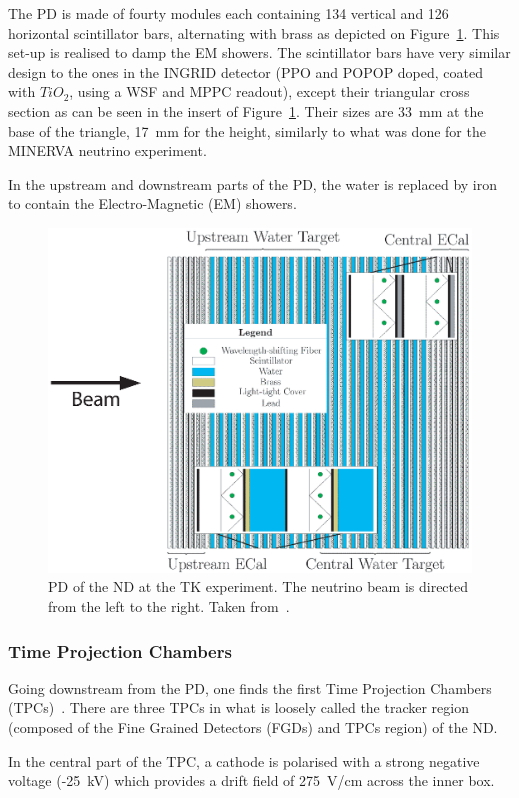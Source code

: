 The \Gls{PD} is made of fourty modules each containing 134 vertical
and 126 horizontal scintillator bars, alternating with brass as
depicted on Figure~\ref{fig:pod}. This set-up is realised to damp the
\Gls{EM} showers. The scintillator bars have very similar design to
the ones in the \Gls{INGRID} detector (\Gls{PPO} and \Gls{POPOP}
doped, coated with $TiO_2$, using a \Gls{WSF} and \Gls{MPPC} readout),
except their triangular cross section as can be seen in the insert of
Figure~\ref{fig:pod}. Their sizes are 33~mm at the base of the
triangle, 17~mm for the height, similarly to what was done for the
\Gls{MINERVA} neutrino experiment.

In the upstream and downstream parts of the \Gls{PD}, the water is
replaced by iron to contain the Electro-Magnetic (\Gls{EM}) showers.

\begin{figure}[ht]
  \center
  \includegraphics[width=0.6\linewidth]{images/t2k/p0d-schematic.eps}
  \caption[P0D of the ND280]{\Gls{PD} of the \Gls{ND} at the \Gls{TK}
    experiment. The neutrino beam is directed from the left to the
    right. Taken from~\cite{POD}.}
  \label{fig:pod}
\end{figure}

\subsubsection{Time Projection Chambers}
\label{subsubsec:tpc}
Going downstream from the \Gls{PD}, one finds the first Time
Projection Chambers (\Glspl{TPC})~\cite{TPC}. There are three
\Glspl{TPC} in what is loosely called the tracker region (composed of
the Fine Grained Detectors (\Glspl{FGD}) and \Glspl{TPC} region) of
the \Gls{ND}.

In the central part of the \Gls{TPC}, a cathode is polarised with a
strong negative voltage (-25~kV) which provides a drift field of
275~V/cm across the inner box.

